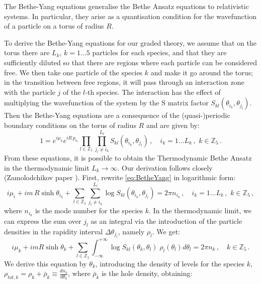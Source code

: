 \documentclass[a4paper,11pt]{article}
\begin{document}
The Bethe-Yang equations generalise the Bethe Ansatz equations to relativistic systems. In particular, they arise as a quantisation condition for the wavefunction of 
a particle on a torus of radius $R$.

To derive the Bethe-Yang equations for our graded theory, we assume that on the torus there are $L_{k}, \,k=1\dots 5$ particles for each species, and that they are sufficiently diluted so that there are regions where each particle can
 be considered free. We then take one particle of the species $k$ and make it go around the torus; in the transition between free regions, it will pass through an interaction zone with the particle $j$ of the $l$-th species.
 The interaction has the effect of multiplying the wavefunction of the system by the S matrix factor $S_{kl}(\theta_{i_{k}},\theta_{j_{l}})$. Then the Bethe-Yang equations are a consequence of the (quasi-)periodic
 boundary conditions on the torus of radius $R$ and are given by:
 \begin{equation}
    \label{eq:BetheYang}
   1=e^{i\mu_k} e^{i R \,p_{i_k}} \prod_{l \in \mathbb{Z}_5}\prod_{j_{l}\neq i_{k}}^{L_{l}}S_{kl}(\theta_{i_{k}},\theta_{j_{l}})\,,\quad i_{k}=1\dots L_{k}\,,\,\, k \in \mathbb{Z}_5\,. 
 \end{equation}
From these equations, it is possible to obtain the Thermodynamic Bethe Ansatz in the thermodynamic limit $L_{k}\rightarrow \infty$. Our derivation follows closely (Zamolodchikov paper \cite{...}).
First, rewrite \eqref{eq:BetheYang} in logarithmic form:
\begin{equation}
   i\mu_i+ i m \,R \sinh{\theta_{i_k}} +\sum_{l \in \mathbb{Z}_5}\sum_{j_{l}\neq i_{k}}^{L_{l}}\log{S_{kl}(\theta_{i_{k}},\theta_{j_{l}})}=2\pi n_{i_k}\,,\quad i_{k}=1\dots L_{k}\,,\,\, k \in \mathbb{Z}_5\,, 
\end{equation}
where $n_{i_k}$ is the mode number for the species $k$.
In the thermodynamic limit, we can express the sum over $j_{l}$ as an integral via the introduction of the particle densities in the rapidity interval $\Delta\theta_{j_{l}}$, namely $\rho_{l}$. We get:
\begin{equation}
    i\mu_k+ i m R \sinh{\theta_{k}} +\sum_{l \in \mathbb{Z}_5}\int_{-\infty}^{+\infty}\log{S_{kl}(\theta_{{k}},\theta_{{l}})}\;\rho_{l}(\theta_{{l}})d\theta_{{l}}=2\pi n_{k}\,,\quad  k \in \mathbb{Z}_5\,.
\end{equation}
We derive this equation by $\theta_{k}$, introducing the density of levels for the species $k$, $\rho_{tot,k}=\rho_{k}+\bar{\rho}_{k}\equiv \frac{d n_k}{d \theta_{k}}$, where $\bar{\rho}_{k}$ is the hole density, obtaining:
\end{document}
